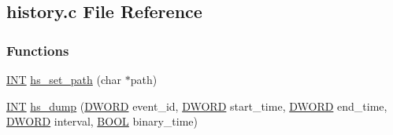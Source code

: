 \subsection{history.c File Reference}
\label{history_8c}
\subsubsection*{Functions}
\begin{DoxyCompactItemize}
\item 
\hyperlink{vppg_8h_a392e62da233ed3e2f7c3fd4f487a3896}{INT} \hyperlink{group__hsfunctioncode_gadd381765666fd1aa3395b63b86d44887}{hs\_\-set\_\-path} (char $\ast$path)
\item 
\hyperlink{vppg_8h_a392e62da233ed3e2f7c3fd4f487a3896}{INT} \hyperlink{group__hsfunctioncode_gaa0adfd626d570a1e37a01f2f8b8afdfd}{hs\_\-dump} (\hyperlink{vt2_8h_a798af1e30bc65f319c1a246cecf59e39}{DWORD} event\_\-id, \hyperlink{vt2_8h_a798af1e30bc65f319c1a246cecf59e39}{DWORD} start\_\-time, \hyperlink{vt2_8h_a798af1e30bc65f319c1a246cecf59e39}{DWORD} end\_\-time, \hyperlink{vt2_8h_a798af1e30bc65f319c1a246cecf59e39}{DWORD} interval, \hyperlink{vt2_8h_a239c7f0d40651c3e419c5b9651507d14}{BOOL} binary\_\-time)
\end{DoxyCompactItemize}

